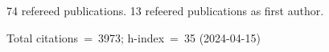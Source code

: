 74 refereed publications. 13 refeered publications as first author.

Total citations~=~3973; h-index~=~35 (2024-04-15)